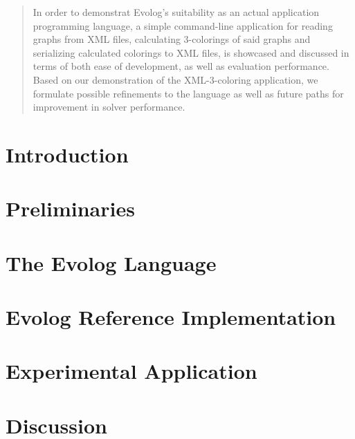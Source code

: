 \documentclass[draft,final]{vutinfth} %
\theoremstyle{definition}
\begin{document}
\begin{abstract}
In order to demonstrat Evolog's suitability as an actual application programming language, a simple command-line application for reading graphs from XML files, calculating 3-colorings of said graphs and serializing calculated colorings to XML files, is showcased and discussed in terms of both ease of development, as well as evaluation performance. Based on our demonstration of the XML-3-coloring application, we formulate possible refinements to the language as well as future paths for improvement in solver performance.
\end{abstract}


\tableofcontents %

\mainmatter

\chapter{Introduction}

\chapter{Preliminaries}


\chapter{The Evolog Language}
\label{chap:language}


\chapter{Evolog Reference Implementation}
\label{chap:implementation}


\chapter{Experimental Application}
\label{chap:application-experiment}


\chapter{Discussion}
\label{chap:discussion}

\end{document}

